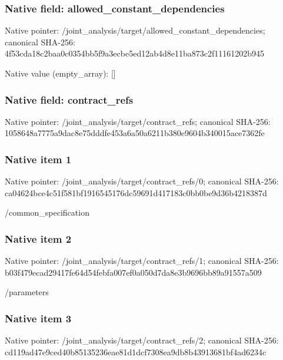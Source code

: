 \documentclass[10pt,a4paper]{article}
\begin{document}
\subsubsection{Native field: allowed\_\allowbreak{}constant\_\allowbreak{}dependencies}
Native pointer: /joint\_\allowbreak{}analysis/target/allowed\_\allowbreak{}constant\_\allowbreak{}dependencies; canonical SHA-256: 4f53cda18c2baa0c0354bb5f9a3ecbe5ed12ab4d8e11ba873c2f11161202b945

Native value (empty\_\allowbreak{}array): []

\subsubsection{Native field: contract\_\allowbreak{}refs}
Native pointer: /joint\_\allowbreak{}analysis/target/contract\_\allowbreak{}refs; canonical SHA-256: 1058648a7775a9dac8e75dddfe453a6a50a6211b380e9604b340015ace7362fe

\subsubsection{Native item 1}
Native pointer: /joint\_\allowbreak{}analysis/target/contract\_\allowbreak{}refs/0; canonical SHA-256: ca04624bce4c51f581bf1916545176dc59691d417183c0bb0be9d36b4218387d

\begingroup\raggedright\sloppy /\allowbreak{}common\_\allowbreak{}specification\par\endgroup

\subsubsection{Native item 2}
Native pointer: /joint\_\allowbreak{}analysis/target/contract\_\allowbreak{}refs/1; canonical SHA-256: b03f479ecad29417fe64d54febfa007ef0a050d7da8e3b9696bb89a91557a509

\begingroup\raggedright\sloppy /\allowbreak{}parameters\par\endgroup

\subsubsection{Native item 3}
Native pointer: /joint\_\allowbreak{}analysis/target/contract\_\allowbreak{}refs/2; canonical SHA-256: cd119ad47e9ced40b85135236eae81d1dcf7308ea9db8b43913681bf4ad6234c
\end{document}
